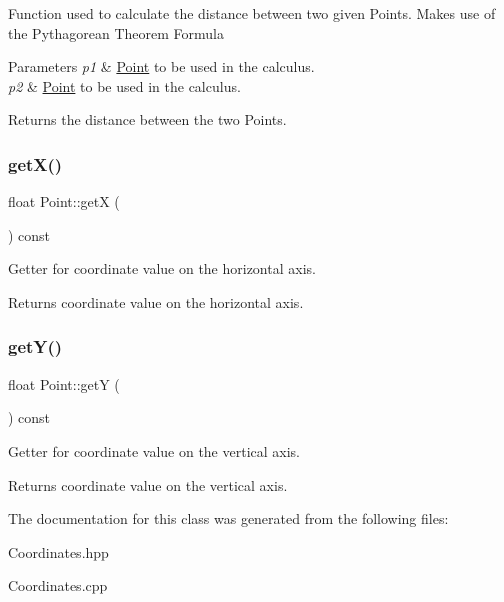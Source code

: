Function used to calculate the distance between two given Points. Makes use of the Pythagorean Theorem Formula


\begin{DoxyParams}{Parameters}
{\em p1} & \hyperlink{class_point}{Point} to be used in the calculus. \\
\hline
{\em p2} & \hyperlink{class_point}{Point} to be used in the calculus.\\
\hline
\end{DoxyParams}
\begin{DoxyReturn}{Returns}
the distance between the two Points. 
\end{DoxyReturn}
\hypertarget{class_point_a29c44ec7c7279e02629645a06cdaf7d5}{}\label{class_point_a29c44ec7c7279e02629645a06cdaf7d5} 
\subsubsection{\texorpdfstring{get\+X()}{getX()}}
{\footnotesize\ttfamily float Point\+::getX (\begin{DoxyParamCaption}{ }\end{DoxyParamCaption}) const}

Getter for coordinate value on the horizontal axis.

\begin{DoxyReturn}{Returns}
coordinate value on the horizontal axis. 
\end{DoxyReturn}
\hypertarget{class_point_a2371ffadbe245d12a8f556d0a976521b}{}\label{class_point_a2371ffadbe245d12a8f556d0a976521b} 
\subsubsection{\texorpdfstring{get\+Y()}{getY()}}
{\footnotesize\ttfamily float Point\+::getY (\begin{DoxyParamCaption}{ }\end{DoxyParamCaption}) const}

Getter for coordinate value on the vertical axis.

\begin{DoxyReturn}{Returns}
coordinate value on the vertical axis. 
\end{DoxyReturn}


The documentation for this class was generated from the following files\+:\begin{DoxyCompactItemize}
\item 
Coordinates.\+hpp\item 
Coordinates.\+cpp\end{DoxyCompactItemize}
